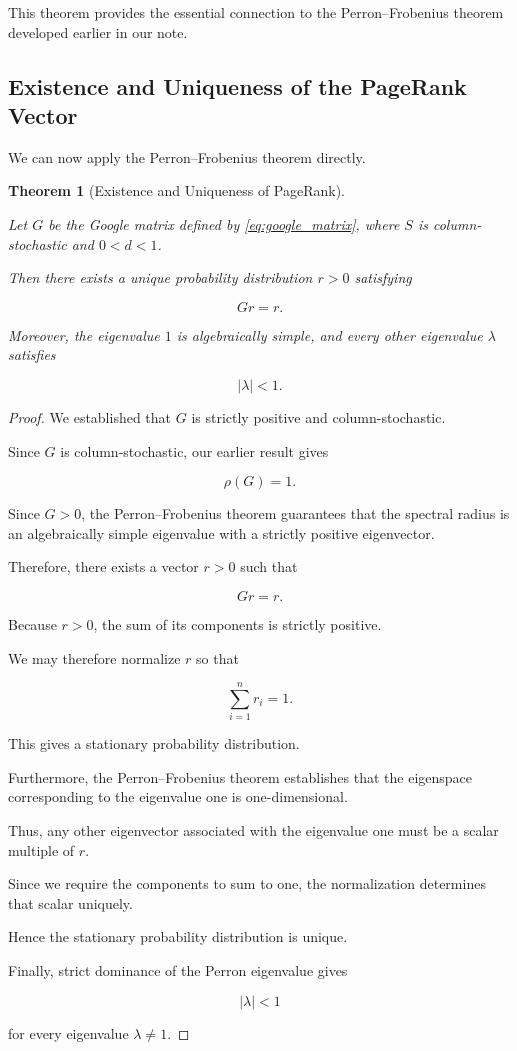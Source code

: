 \documentclass[11pt,a4paper]{article}
\newtheorem{theorem}{Theorem}[section]
\theoremstyle{definition}
\theoremstyle{remark}
\begin{document}
This theorem provides
the essential connection
to the Perron--Frobenius
theorem developed
earlier in our note.


\subsection{Existence and Uniqueness
of the PageRank Vector}

We can now apply
the Perron--Frobenius
theorem directly.

\begin{theorem}[Existence and Uniqueness
of PageRank]
\label{thm:pagerank_unique}

Let $G$ be the Google
matrix defined by
\eqref{eq:google_matrix},
where $S$ is
column-stochastic
and $0<d<1$.

Then there exists
a unique probability
distribution $r>0$
satisfying

\begin{equation}
\boxed{Gr=r.}
\label{eq:modified_pagerank_equation}
\end{equation}

Moreover, the eigenvalue
$1$ is algebraically
simple, and every other
eigenvalue $\lambda$
satisfies

\[
|\lambda|<1.
\]

\end{theorem}

\begin{proof}

We established that
$G$ is strictly positive
and column-stochastic.

Since $G$ is
column-stochastic,
our earlier result gives

\[
\rho(G)=1.
\]

Since $G>0$, the
Perron--Frobenius theorem
guarantees that the
spectral radius is
an algebraically
simple eigenvalue
with a strictly
positive eigenvector.

Therefore, there exists
a vector $r>0$
such that

\[
Gr=r.
\]

Because $r>0$,
the sum of its components
is strictly positive.

We may therefore
normalize $r$ so that

\[
\sum_{i=1}^{n}r_i=1.
\]

This gives a stationary
probability distribution.

Furthermore, the
Perron--Frobenius theorem
establishes that the
eigenspace corresponding
to the eigenvalue one
is one-dimensional.

Thus, any other
eigenvector associated
with the eigenvalue one
must be a scalar
multiple of $r$.

Since we require
the components to
sum to one,
the normalization
determines that
scalar uniquely.

Hence the stationary
probability distribution
is unique.

Finally, strict dominance
of the Perron eigenvalue
gives

\[
|\lambda|<1
\]

for every eigenvalue
$\lambda\neq1$.

\end{proof}
\end{document}

